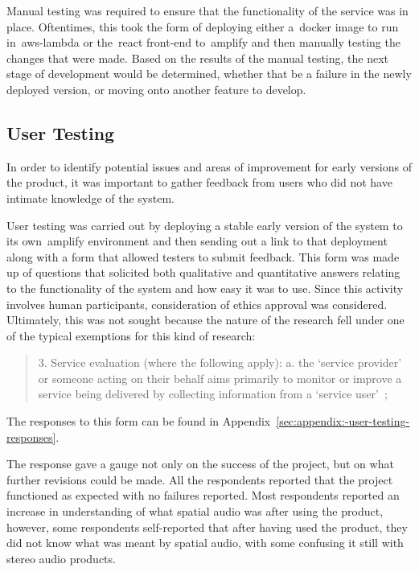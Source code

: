 Manual testing was required to ensure that the functionality of the service was in place.
Oftentimes, this took the form of deploying either a~\gls{docker} image
to run in~\gls{aws-lambda} or the~\gls{react} front-end to~\gls{amplify} and
then manually testing the changes that were made.
Based on the results of the manual testing, the next stage of development would be determined,
whether that be a failure in the newly deployed version, or moving onto another feature to develop.

\subsection{User Testing}\label{subsec:user-testing}

In order to identify potential issues and areas of improvement for early versions of the product,
it was important to gather feedback from users who did not have intimate knowledge of the system.

User testing was carried out
by deploying a stable early version of the system to its own~\gls{amplify} environment
and then sending out a link to that deployment along with a form that allowed testers to submit feedback.
This form was made up of questions
that solicited both qualitative and quantitative answers relating to the functionality of the system
and how easy it was to use.
Since this activity involves human participants, consideration of ethics approval was considered.
Ultimately,
this was not sought
because the nature of the research fell under one of the typical exemptions for this kind of research:

\begin{quotation}
    3.
    Service evaluation (where the following apply):
    a.
    the ‘service provider’
    or someone acting on their behalf aims primarily
    to monitor or improve a service being delivered by collecting information from a `service user'~\citep{qmul_2023};
\end{quotation}


The responses to this form can be found in Appendix~\ref{sec:appendix:-user-testing-responses}.

The response gave a gauge not only on the success of the project, but on what further revisions could be made.
All the respondents reported that the project functioned as expected with no failures reported.
Most respondents reported an increase in understanding of what spatial audio was after using the product,
however, some respondents self-reported that after having used the product,
they did not know what was meant by spatial audio, with some confusing it still with stereo audio products.

